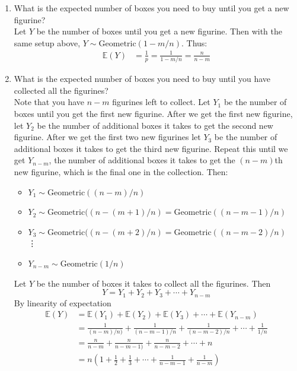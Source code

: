 \documentclass[12pt]{article}
\def\E{{\mathbb E}}
\begin{document}
\begin{enumerate}
\begin{enumerate}
\item What is the expected number of boxes you need to buy until you get a new figurine?\\

Let $Y$ be the number of boxes until you get a new figurine. Then with the same setup above, $Y \sim\text{Geometric}(1 - m/n)$. Thus:
\begin{align*}
\E(Y) &= \frac{1}{p} = \frac{1}{1 - m/n} = \frac{n}{n-m}
\end{align*}
\item What is the expected number of boxes you need to buy until you have collected all the figurines? \\

Note that you have $n-m$ figurines left to collect. Let $Y_1$ be the number of boxes until you get the first new figurine. After we get the first new figurine, let $Y_2$ be the number of additional boxes it takes to get the second new figurine. After we get the first two new figurines let $Y_3$ be the number of additional boxes it takes to get the third new figurine. Repeat this until we get $Y_{n-m}$, the number of additional boxes it takes to get the $(n-m)$th new figurine, which is the final one in the collection. Then:
\begin{itemize}
\item $Y_1 \sim\text{Geometric}((n-m)/n)$
\item $Y_2 \sim\text{Geometric}((n - (m + 1)/n) = \text{Geometric}((n - m - 1)/n)$\\
\item $Y_3 \sim\text{Geometric}((n - (m + 2)/n) = \text{Geometric}((n - m - 2)/n)$\\
\vdots\\
\item $Y_{n-m} \sim\text{Geometric}(1/n)$
\end{itemize}
Let $Y$ be the number of boxes it takes to collect all the figurines. Then
\[
Y = Y_1 + Y_2 + Y_3 + \cdots + Y_{n-m}
\]
By linearity of expectation
\begin{align*}
\E(Y) &= \E(Y_1) + \E(Y_2) + \E(Y_3) + \cdots + \E(Y_{n-m}) \\
&= \frac{1}{(n-m)/n)} + \frac{1}{(n - m - 1)/n} + \frac{1}{(n - m - 2)/n} + \cdots + \frac{1}{1/n} \\
&=  \frac{n}{n-m} + \frac{n}{n - m - 1)} + \frac{n}{n - m - 2} + \cdots + n \\
&= n\left(1 + \frac{1}{2} + \frac{1}{3} + \cdots + \frac{1}{n-m-1} + \frac{1}{n-m}  \right)
\end{align*}

\end{enumerate}

\end{enumerate}
\end{document}

